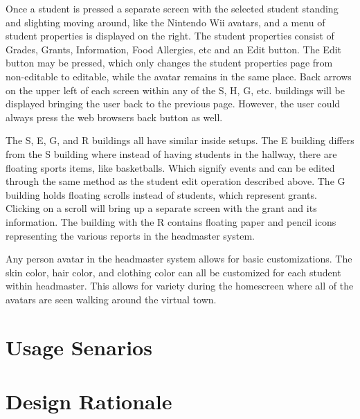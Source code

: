 \documentclass[11pt]{article}
\begin{document}
Once a student is pressed a separate screen with the selected student standing and slighting moving around, like the Nintendo Wii avatars, and a menu of student properties is displayed on the right. The student properties consist of Grades, Grants, Information, Food Allergies, etc and an Edit button. The Edit button may be pressed, which only changes the student properties page from non-editable to editable, while the avatar remains in the same place. Back arrows on the upper left of each screen within any of the S, H, G, etc. buildings will be displayed bringing the user back to the previous page. However, the user could always press the web browsers back button as well.

The S, E, G, and R buildings all have similar inside setups. The E building differs from the S building where instead of having students in the hallway, there are floating sports items, like basketballs. Which signify events and can be edited through the same method as the student edit operation described above. The G building holds floating scrolls instead of students, which represent grants. Clicking on a scroll will bring up a separate screen with the grant and its information. The building with the R contains floating paper and pencil icons representing the various reports in the headmaster system. 

Any person avatar in the headmaster system allows for basic customizations. The skin color, hair color, and clothing color can all be customized for each student within headmaster. This allows for variety during the homescreen where all of the avatars are seen walking around the virtual town.

\section{Usage Senarios}

\section{Design Rationale}
\end{document}

